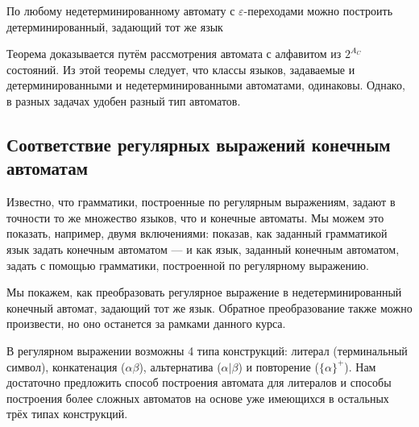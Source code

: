 \documentclass[12pt,a4paper,oneside]{article}
\begin{document}
\begin{theorem}
По любому недетерминированному автомату с $\varepsilon$-переходами 
можно построить детерминированный, задающий тот же язык
\end{theorem}

Теорема доказывается путём рассмотрения автомата с алфавитом из $2^{A_C}$ состояний. 
Из этой теоремы следует, что классы языков, задаваемые и детерминированными и
недетерминированными автоматами, одинаковы. Однако, в разных задачах удобен разный тип
автоматов.

\subsection{Соответствие регулярных выражений конечным автоматам}

Известно, что грамматики, построенные по регулярным выражениям, задают в точности то же 
множество языков, что и конечные автоматы.
Мы можем это показать, например, двумя включениями: показав, как заданный грамматикой язык
задать конечным автоматом --- и как язык, заданный конечным автоматом, задать с помощью 
грамматики, построенной по регулярному выражению.

Мы покажем, как преобразовать регулярное выражение в недетерминированный конечный автомат, задающий 
тот же язык. 
Обратное преобразование также можно произвести, но оно останется за рамками данного курса.

В регулярном выражении возможны 4 типа конструкций: литерал (терминальный символ),
конкатенация ($\alpha\beta$), альтернатива ($\alpha|\beta$)
и повторение ($\{\alpha\}^+$). Нам достаточно предложить способ построения автомата для
литералов и способы построения более сложных автоматов на основе уже имеющихся в остальных 
трёх типах конструкций. 
\end{document}
